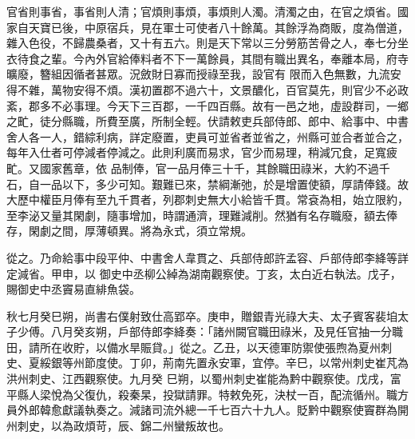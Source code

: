 \begin{pinyinscope}
 官省則事省，事省則人清；官煩則事煩，事煩則人濁。清濁之由，在官之煩省。國家自天寶已後，中原宿兵，見在軍士可使者八十餘萬。其餘浮為商販，度為僧道，雜入色役，不歸農桑者，又十有五六。則是天下常以三分勞筋苦骨之人，奉七分坐衣待食之輩。今內外官給俸料者不下一萬餘員，其間有職出異名，奉離本局，府寺曠廢，簪組因循者甚眾。況斂財日寡而授祿至我，設官有
 限而入色無數，九流安得不雜，萬物安得不煩。漢初置郡不過六十，文景醲化，百官莫先，則官少不必政紊，郡多不必事理。今天下三百郡，一千四百縣。故有一邑之地，虛設群司，一鄉之甿，徒分縣職，所費至廣，所制全輕。伏請敕吏兵部侍郎、郎中、給事中、中書舍人各一人，錯綜利病，詳定廢置，吏員可並省者並省之，州縣可並合者並合之，每年入仕者可停減者停減之。此則利廣而易求，官少而易理，稍減冗食，足寬疲甿。又國家舊章，依
 品制俸，官一品月俸三十千，其餘職田祿米，大約不過千石，自一品以下，多少可知。艱難已來，禁綱漸弛，於是增置使額，厚請俸錢。故大歷中權臣月俸有至九千貫者，列郡刺史無大小給皆千貫。常袞為相，始立限約，至李泌又量其閑劇，隨事增加，時謂通濟，理難減削。然猶有名存職廢，額去俸存，閑劇之間，厚薄頓異。將為永式，須立常規。



 從之。乃命給事中段平仲、中書舍人韋貫之、兵部侍郎許孟容、戶部侍郎李絳等詳定減省。甲申，以
 御史中丞柳公綽為湖南觀察使。丁亥，太白近右執法。戊子，賜御史中丞竇易直緋魚袋。



 秋七月癸巳朔，尚書右僕射致仕高郢卒。庚申，贈銀青光祿大夫、太子賓客裴垍太子少傅。八月癸亥朔，戶部侍郎李絳奏：「諸州闕官職田祿米，及見任官抽一分職田，請所在收貯，以備水旱賑貸。」從之。乙丑，以天德軍防禦使張煦為夏州刺史、夏綏銀等州節度使。丁卯，荊南先置永安軍，宜停。辛巳，以常州刺史崔芃為洪州刺史、江西觀察使。九月癸
 巳朔，以蜀州刺史崔能為黔中觀察使。戊戌，富平縣人梁悅為父復仇，殺秦杲，投獄請罪。特敕免死，決杖一百，配流循州。職方員外郎韓愈獻議執奏之。減諸司流外總一千七百六十九人。貶黔中觀察使竇群為開州刺史，以為政煩苛，辰、錦二州蠻叛故也。




\end{pinyinscope}
